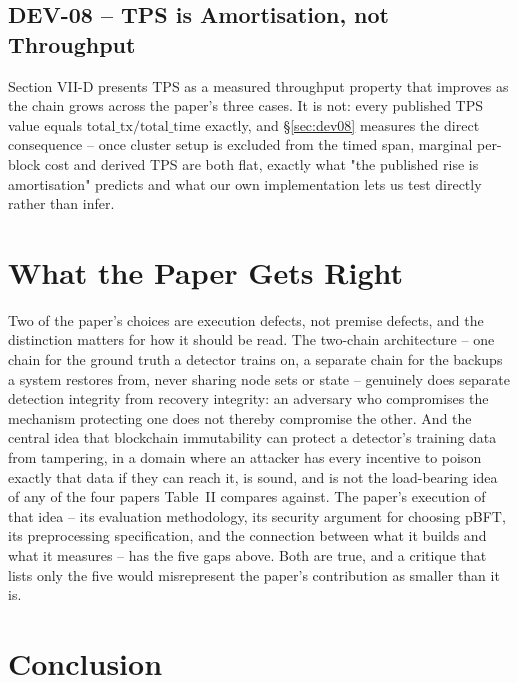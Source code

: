 \documentclass[conference]{IEEEtran}
\begin{document}
\subsection{DEV-08 -- TPS is Amortisation, not Throughput}

Section VII-D presents TPS as a measured throughput property that improves as the chain grows
across the paper's three cases. It is not: every published TPS value equals
$\text{total\_tx}/\text{total\_time}$ exactly, and \S\ref{sec:dev08} measures the direct
consequence -- once cluster setup is excluded from the timed span, marginal per-block cost and
derived TPS are both flat, exactly what "the published rise is amortisation" predicts and what
our own implementation lets us test directly rather than infer.

\section{What the Paper Gets Right}

Two of the paper's choices are execution defects, not premise defects, and the distinction
matters for how it should be read. The two-chain architecture -- one chain for the ground truth a
detector trains on, a separate chain for the backups a system restores from, never sharing node
sets or state -- genuinely does separate detection integrity from recovery integrity: an
adversary who compromises the mechanism protecting one does not thereby compromise the other. And
the central idea that blockchain immutability can protect a detector's training data from
tampering, in a domain where an attacker has every incentive to poison exactly that data if they
can reach it, is sound, and is not the load-bearing idea of any of the four papers Table~II
compares against. The paper's execution of that idea -- its evaluation methodology, its security
argument for choosing pBFT, its preprocessing specification, and the connection between what it
builds and what it measures -- has the five gaps above. Both are true, and a critique that lists
only the five would misrepresent the paper's contribution as smaller than it is.

\section{Conclusion}
\end{document}
